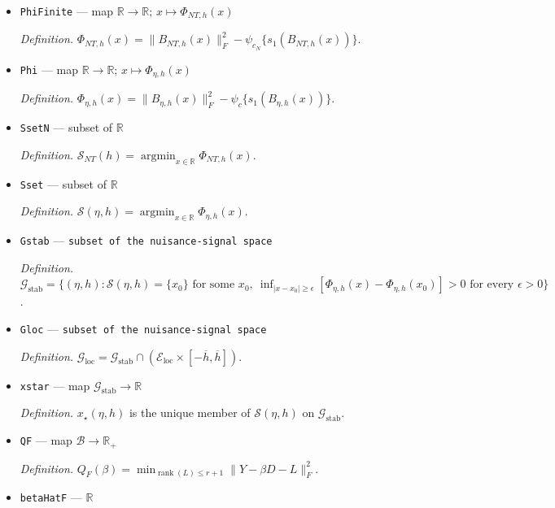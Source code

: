 \documentclass{article}
\begin{document}
\begin{itemize}
  \par\smallskip\noindent\emph{Definition.} \(\psi_{\rho}(s)=(1+\sqrt\rho)^2\mathbf 1\{s\le\rho^{1/4}\}+(s^2+1+\rho+\rho/s^2)\mathbf 1\{s>\rho^{1/4}\}\).
  \item \texttt{PhiFinite} --- map \(\mathbb R\to\mathbb R\); \(x\mapsto\Phi_{NT,h}(x)\)
  \par\smallskip\noindent\emph{Definition.} \(\Phi_{NT,h}(x)=\|B_{NT,h}(x)\|_F^2-\psi_{c_N}\{s_1(B_{NT,h}(x))\}\).
  \item \texttt{Phi} --- map \(\mathbb R\to\mathbb R\); \(x\mapsto\Phi_{\eta,h}(x)\)
  \par\smallskip\noindent\emph{Definition.} \(\Phi_{\eta,h}(x)=\|B_{\eta,h}(x)\|_F^2-\psi_c\{s_1(B_{\eta,h}(x))\}\).
  \item \texttt{SsetN} --- subset of \(\mathbb R\)
  \par\smallskip\noindent\emph{Definition.} \(\mathcal S_{NT}(h)=\operatorname*{argmin}_{x\in\mathbb R}\Phi_{NT,h}(x)\).
  \item \texttt{Sset} --- subset of \(\mathbb R\)
  \par\smallskip\noindent\emph{Definition.} \(\mathcal S(\eta,h)=\operatorname*{argmin}_{x\in\mathbb R}\Phi_{\eta,h}(x)\).
  \item \texttt{Gstab} --- \texttt{subset of the nuisance-\allowbreak{}signal space}
  \par\smallskip\noindent\emph{Definition.} \(\mathcal G_{\mathrm{stab}}=\{(\eta,h):\mathcal S(\eta,h)=\{x_0\}\text{ for some }x_0,\ \inf_{|x-x_0|\ge\epsilon}[\Phi_{\eta,h}(x)-\Phi_{\eta,h}(x_0)]>0\text{ for every }\epsilon>0\}\).
  \item \texttt{Gloc} --- \texttt{subset of the nuisance-\allowbreak{}signal space}
  \par\smallskip\noindent\emph{Definition.} \(\mathcal G_{\mathrm{loc}}=\mathcal G_{\mathrm{stab}}\cap(\mathcal E_{\mathrm{loc}}\times[-\overline h,\overline h])\).
  \item \texttt{xstar} --- map \(\mathcal G_{\mathrm{stab}}\to\mathbb R\)
  \par\smallskip\noindent\emph{Definition.} \(x_\star(\eta,h)\) is the unique member of \(\mathcal S(\eta,h)\) on \(\mathcal G_{\mathrm{stab}}\).
  \item \texttt{QF} --- map \(\mathcal B\to\mathbb R_{+}\)
  \par\smallskip\noindent\emph{Definition.} \(Q_F(\beta)=\min_{\operatorname{rank}(L)\le r+1}\|Y-\beta D-L\|_F^2\).
  \item \texttt{betaHatF} --- \(\mathbb R\)

\end{itemize}
\end{document}
